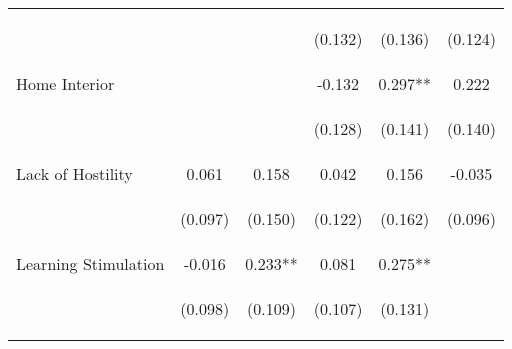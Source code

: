 \begin{tabular}{lccccc}
 & \begin{footnotesize}\end{footnotesize} & \begin{footnotesize}\end{footnotesize} & \begin{footnotesize}(0.132)\end{footnotesize} & \begin{footnotesize}(0.136)\end{footnotesize} & \begin{footnotesize}(0.124)\end{footnotesize}\\
\noalign{\smallskip}Home Interior &  &  & -0.132 & 0.297** & 0.222\\
 & \begin{footnotesize}\end{footnotesize} & \begin{footnotesize}\end{footnotesize} & \begin{footnotesize}(0.128)\end{footnotesize} & \begin{footnotesize}(0.141)\end{footnotesize} & \begin{footnotesize}(0.140)\end{footnotesize}\\
\noalign{\smallskip}Lack of Hostility & 0.061 & 0.158 & 0.042 & 0.156 & -0.035\\
 & \begin{footnotesize}(0.097)\end{footnotesize} & \begin{footnotesize}(0.150)\end{footnotesize} & \begin{footnotesize}(0.122)\end{footnotesize} & \begin{footnotesize}(0.162)\end{footnotesize} & \begin{footnotesize}(0.096)\end{footnotesize}\\
\noalign{\smallskip}Learning Stimulation & -0.016 & 0.233** & 0.081 & 0.275** & \\
 & \begin{footnotesize}(0.098)\end{footnotesize} & \begin{footnotesize}(0.109)\end{footnotesize} & \begin{footnotesize}(0.107)\end{footnotesize} & \begin{footnotesize}(0.131)\end{footnotesize} & \begin{footnotesize}\end{footnotesize}\\

\end{tabular}
